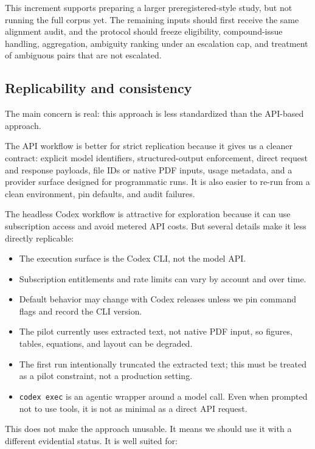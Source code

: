 \documentclass[
  11pt,
  letterpaper,
]{article}
\providecommand{\tightlist}{%
  \setlength{\itemsep}{0pt}\setlength{\parskip}{0pt}}
\begin{document}
This increment supports preparing a larger preregistered-style study,
but not running the full corpus yet. The remaining inputs should first
receive the same alignment audit, and the protocol should freeze
eligibility, compound-issue handling, aggregation, ambiguity ranking
under an escalation cap, and treatment of ambiguous pairs that are not
escalated.

\subsection{Replicability and
consistency}\label{replicability-and-consistency}

The main concern is real: this approach is less standardized than the
API-based approach.

The API workflow is better for strict replication because it gives us a
cleaner contract: explicit model identifiers, structured-output
enforcement, direct request and response payloads, file IDs or native
PDF inputs, usage metadata, and a provider surface designed for
programmatic runs. It is also easier to re-run from a clean environment,
pin defaults, and audit failures.

The headless Codex workflow is attractive for exploration because it can
use subscription access and avoid metered API costs. But several details
make it less directly replicable:

\begin{itemize}
\tightlist
\item
  The execution surface is the Codex CLI, not the model API.
\item
  Subscription entitlements and rate limits can vary by account and over
  time.
\item
  Default behavior may change with Codex releases unless we pin command
  flags and record the CLI version.
\item
  The pilot currently uses extracted text, not native PDF input, so
  figures, tables, equations, and layout can be degraded.
\item
  The first run intentionally truncated the extracted text; this must be
  treated as a pilot constraint, not a production setting.
\item
  \texttt{codex\ exec} is an agentic wrapper around a model call. Even
  when prompted not to use tools, it is not as minimal as a direct API
  request.
\end{itemize}

This does not make the approach unusable. It means we should use it with
a different evidential status. It is well suited for:
\end{document}
